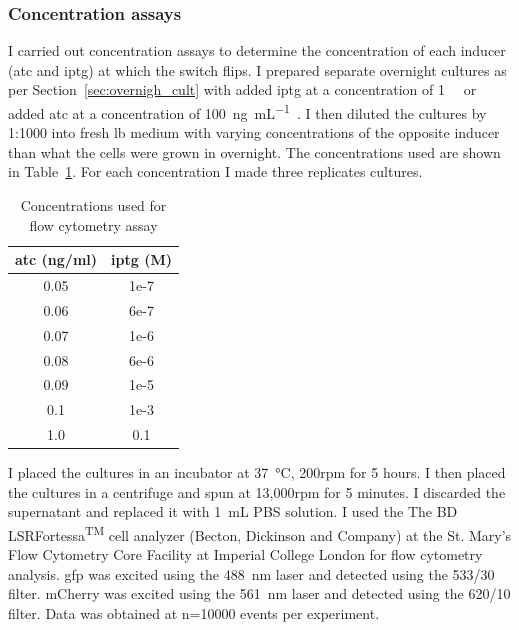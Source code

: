 \subsubsection{Concentration assays}
\label{sec:flo_conc}
I carried out concentration assays to determine the concentration of each inducer (\acrshort{atc} and \acrshort{iptg}) at which the switch flips.  I prepared separate overnight cultures as per Section~\ref{sec:overnigh_cult} with added \acrshort{iptg} at a concentration of \SI{1}{\milli\molar} or added \acrshort{atc} at a concentration of \SI{100}{\nano\gram\per\milli\liter}~\autocite{Litcofsky:2012gr}. I then diluted the cultures by 1:1000 into fresh \acrshort{lb} medium with varying concentrations of the opposite inducer than what the cells were grown in overnight. The concentrations used are shown in Table~\ref{tab:flow_conc}. For each concentration I made three replicates cultures.


\begin{table}[htbp]
\centering
\caption{Concentrations used for flow cytometry assay}
\label{tab:flow_conc}
\begin{tabular}{@{}cc@{}}
\toprule
\acrshort{atc} (ng/ml)  & \acrshort{iptg} (M) \\ \midrule
0.05 & 1e-7 \\
0.06 & 6e-7 \\
0.07 & 1e-6 \\
0.08 & 6e-6 \\
0.09 & 1e-5 \\
0.1  & 1e-3 \\
1.0  & 0.1  \\ \bottomrule
\end{tabular}
\end{table}

I placed the cultures in an incubator at \SI{37}{\celsius}, 200rpm for 5 hours. I then placed the cultures in a centrifuge and spun at 13,000rpm for 5 minutes. I discarded the supernatant and replaced it with \SI{1}{\milli\liter} PBS solution. I used the The BD LSRFortessa\textsuperscript{TM} cell analyzer (Becton, Dickinson and Company) at the St. Mary's Flow Cytometry Core Facility at Imperial College London  for flow cytometry analysis. \acrshort{gfp} was excited using the \SI{488}{\nano\meter} laser and detected using the 533/30 filter. mCherry was excited using the \SI{561}{\nano\meter} laser and detected using the 620/10 filter. Data was obtained at n=10000 events per experiment. 


